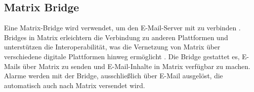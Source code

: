 \subsection{Matrix Bridge}
Eine Matrix-Bridge wird verwendet, um den E-Mail-Server mit  zu verbinden \cite{jojii_jojiiofficialmatrix-emailbridge_2024}. Bridges in Matrix erleichtern die Verbindung zu anderen Plattformen und unterstützen die Interoperabilität, was die Vernetzung von Matrix über verschiedene digitale Plattformen hinweg ermöglicht \cite{noauthor_bridges_nodate}. Die Bridge gestattet es, E-Mails über Matrix zu senden und E-Mail-Inhalte in Matrix verfügbar zu machen. Alarme werden mit der Bridge, ausschließlich über E-Mail ausgelöst, die automatisch auch nach Matrix versendet wird.

